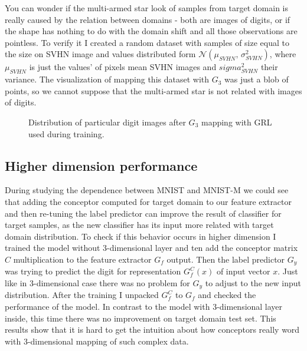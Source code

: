 \documentclass{article}
\begin{document}
\par
You can wonder if the multi-armed star look of samples from target domain is really caused by the relation between domains - both are images of digits, or if the shape has nothing to do with the domain shift and all those observations are pointless. To verify it I created a random dataset with samples of size equal to the size on SVHN image and values distributed form $\mathcal{N}(\mu_{SVHN},\,\sigma_{SVHN}^{2})$, where $\mu_{SVHN}$ is just the values' of pixels mean SVHN images and $sigma_{SVHN}^{2}$ their variance. The visualization of mapping this dataset with $G_{3}$ was just a blob of points, so we cannot suppose that the multi-armed star is not related with images of digits.

\begin{figure}[htb]%
\captionsetup[subfigure]{labelformat=empty}
    \centering
    \qquad
    \caption{Distribution of particular digit images after $G_{3}$ mapping with GRL used during training.}%
    \label{fig:SVHN_GRL}%
\end{figure}

\subsection{Higher dimension performance}
\par
During studying the dependence between MNIST and MNIST-M we could see that adding the conceptor computed for target domain to our feature extractor and then re-tuning the label predictor can improve the result of classifier for target samples, as the new classifier has its input more related with target domain distribution. To check if this behavior occurs in higher dimension I trained the model without 3-dimensional layer and ten add the conceptor matrix $C$ multiplication to the feature extractor $G_{f}$ output. Then the label predictor $G_{y}$ was trying to predict the digit for representation $G_{f}^{C}(x)$ of input vector $x$. Just like in 3-dimensional case there was no problem for $G_{y}$ to adjust to the new input distribution. After the training I unpacked $G_{f}^{C}$ to $G_{f}$ and checked the performance of the model. In contrast to the model with 3-dimensional layer inside, this time there was no improvement on target domain test set. This results show that it is hard to get the intuition about how conceptors really word with 3-dimensional mapping of such complex data.
\end{document}
